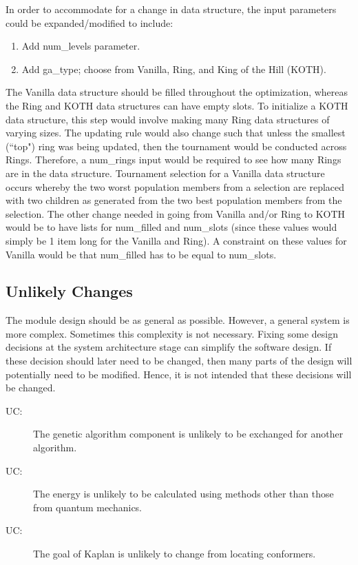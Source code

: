 \documentclass[12pt, titlepage]{article}
\newcounter{ucnum}
\newcommand{\uctheucnum}{UC\theucnum}
\newcommand{\progname}{Kaplan} %
\begin{document}
In order to accommodate for a change in data structure, the input parameters 
could be expanded/modified to include:
\begin{enumerate}
	\item Add num\_levels parameter.
	\item Add ga\_type; choose from Vanilla, Ring, and King of the Hill (KOTH).
\end{enumerate}

The Vanilla data structure should be filled throughout the optimization, 
whereas the Ring and KOTH data structures can have empty slots. To initialize a 
KOTH data structure, this step would involve making many Ring data structures 
of varying sizes. The updating rule would also change such that unless the 
smallest (``top") ring was being updated, then the tournament would be 
conducted across Rings. Therefore, a num\_rings input would be required to see 
how many Rings are in the data structure. Tournament selection for a Vanilla 
data structure occurs whereby the two worst population members from a selection 
are replaced with two children as generated from the two best population 
members from the selection. The other change needed in going from Vanilla 
and/or Ring to KOTH would be to have lists for num\_filled and num\_slots 
(since these values would simply be 1 item long for the Vanilla and Ring). A 
constraint on these values for Vanilla would be that num\_filled has to be 
equal to num\_slots.

\subsection{Unlikely Changes} \label{SecUchange}

The module design should be as general as possible. However, a general system is
more complex. Sometimes this complexity is not necessary. Fixing some design
decisions at the system architecture stage can simplify the software design. If
these decision should later need to be changed, then many parts of the design
will potentially need to be modified. Hence, it is not intended that these
decisions will be changed.

\begin{description}
\item[ \uctheucnum \label{ucGA}:] The genetic algorithm 
component is unlikely to be exchanged for another algorithm.
\item[ \uctheucnum \label{ucEnery}:] The energy is 
unlikely to be calculated using methods other than those from quantum mechanics.
\item[ \uctheucnum \label{ucgoal}:] The goal of 
\progname{} is unlikely to change from locating conformers.
\end{description}
\end{document}
